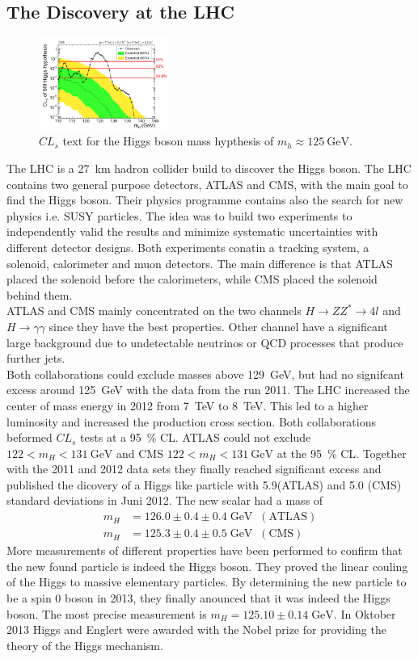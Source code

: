 \subsection{The Discovery at the LHC}
\begin{figure}
    \includegraphics[width=0.38\textwidth]{graphics/higgs.png}
    \caption{$CL_s$ text for the Higgs boson mass hypthesis of $m_h\approx\SI{125}{\GeV}$. \cite{higgs}}
  \end{figure}
  \FloatBarrier
The LHC is a \SI{27}{\kilo\meter} hadron collider build to discover the Higgs boson. The LHC contains two general purpose detectors, ATLAS and CMS, with the main goal to find the Higgs boson. Their physics programme contains also the search for new physics i.e. SUSY particles. The idea was to build two experiments to independently valid the results and minimize systematic uncertainties with different detector designs. Both experiments conatin a tracking system, a solenoid, calorimeter and muon detectors. The main difference is that ATLAS placed the solenoid before the calorimeters, while CMS placed the solenoid behind them.\\
ATLAS and CMS mainly concentrated on the two channels $H\rightarrow ZZ^* \rightarrow 4l$ and $H\rightarrow \gamma\gamma$ since they have the best properties. Other channel have a significant large background due to undetectable neutrinos or QCD processes that produce further jets.\\
Both collaborations could exclude masses above \SI{129}{\GeV}, but had no signifcant excess around \SI{125}{\GeV} with the data from the run 2011. The LHC increased the center of mass energy in 2012 from \SI{7}{\TeV} to \SI{8}{\TeV}. This led to a higher luminosity and increased the production cross section. Both collaborations beformed $CL_s$ tests at a \SI{95}{\percent} CL. ATLAS could not exclude $122<m_H<\SI{131}{\GeV}$ and CMS $122<m_H<\SI{131}{\GeV}$ at the \SI{95}{\percent} CL. Together with the 2011 and 2012 data sets they finally reached significant excess and published the dicovery of a Higgs like particle with 5.9(ATLAS) and 5.0 (CMS) standard deviations in Juni 2012. The new scalar had a mass of
\begin{align*}
	m_H &= 126.0 \pm 0.4\pm0.4 \;\si{\GeV} \;\;(\text{ATLAS})\\
	m_H &= 125.3 \pm 0.4\pm0.5 \;\si{\GeV} \;\; (\text{CMS})
\end{align*}
More measurements of different properties have been performed to confirm that the new found particle is indeed the Higgs boson. They proved the linear couling of the Higgs to massive elementary particles. By determining the new particle to be a spin 0 boson in 2013, they finally anounced that it was indeed the Higgs boson. The most precise measurement is $m_H = 125.10\pm0.14\;\si{\GeV}$. In Oktober 2013 Higgs and Englert were awarded with the Nobel prize for providing the theory of the Higgs mechanism.
